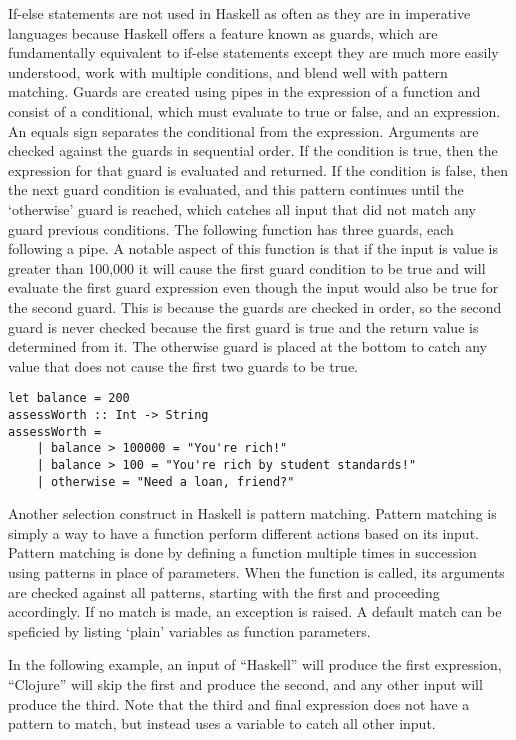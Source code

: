 \documentclass[titlepage,12pt]{article}
\begin{document}
If-else statements are not used in Haskell as often as they are in imperative languages because Haskell offers a feature 
known as guards, which are fundamentally equivalent to if-else statements except they are much more easily understood, 
work with multiple conditions, and blend well with pattern matching. Guards are created using pipes in the 
expression of a function and consist of a conditional, which must evaluate to true or false, and an expression. 
An equals sign separates the conditional from the expression. Arguments are checked against the guards in 
sequential order. If the condition is true, then the expression for that guard is evaluated and returned. 
If the condition is false, then the next guard condition is evaluated, and this pattern continues until the 
`otherwise' guard is reached, which catches all input that did not match any guard previous conditions. The 
following function has three guards, each following a pipe. A notable aspect of this function is that if the 
input is value is greater than 100,000 it will cause the first guard condition to be true and will evaluate the 
first guard expression even though the input would also be true for the second guard. This is because the guards are 
checked in order, so the second guard is never checked because the first guard is true and the return value is 
determined from it. The otherwise guard is placed at the bottom to catch any value that does not cause the first two guards to be true. 

\begin{verbatim}
let balance = 200
assessWorth :: Int -> String
assessWorth =
    | balance > 100000 = "You're rich!"
    | balance > 100 = "You're rich by student standards!"
    | otherwise = "Need a loan, friend?"
\end{verbatim}

Another selection construct in Haskell is pattern matching. Pattern matching is simply a way to have a 
function perform different actions based on its input. Pattern matching is done by defining a function multiple times in 
succession using patterns in place of parameters.  When the function is called, its arguments are checked against all patterns,
starting with the first and proceeding accordingly.  If no match is made, an exception is raised.
A default match can be speficied by listing `plain' variables as function parameters.

In the following example, an input of ``Haskell'' will produce the first expression, ``Clojure'' will skip the first 
and produce the second, and any other input will produce the third. Note that the third and final expression does 
not have a pattern to match, but instead uses a variable to catch all other input. 
\end{document}
